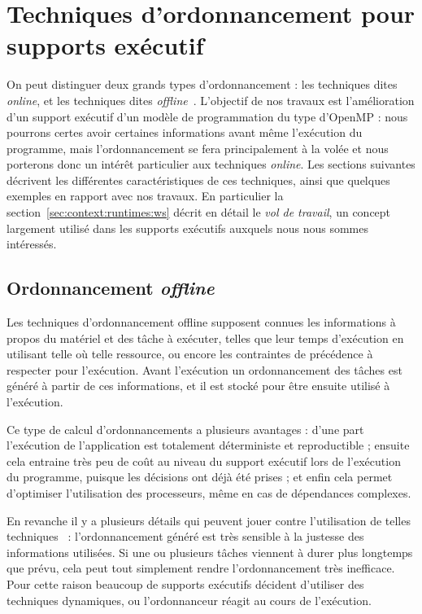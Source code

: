 \section{Techniques d'ordonnancement pour supports exécutif}\label{sec:context:runtimes}

On peut distinguer deux grands types d'ordonnancement : les techniques dites \emph{online}, et les techniques dites \emph{offline}~\cite{Karp1992}.
L'objectif de nos travaux est l'amélioration d'un support exécutif d'un modèle de programmation du type d'OpenMP : nous pourrons certes avoir certaines informations avant même l'exécution du programme, mais l'ordonnancement se fera principalement à la volée et nous porterons donc un intérêt particulier aux techniques \emph{online}.
Les sections suivantes décrivent les différentes caractéristiques de ces techniques, ainsi que quelques exemples en rapport avec nos travaux.
En particulier la section~\ref{sec:context:runtimes:ws} décrit en détail le \emph{vol de travail}, un concept largement utilisé dans les supports exécutifs auxquels nous nous sommes intéressés.

\subsection{Ordonnancement \emph{offline}}

Les techniques d'ordonnancement offline supposent connues les informations à propos du matériel et des tâche à exécuter, telles que leur temps d'exécution en utilisant telle où telle ressource, ou encore les contraintes de précédence à respecter pour l'exécution.
Avant l'exécution un ordonnancement des tâches est généré à partir de ces informations, et il est stocké pour être ensuite utilisé à l'exécution.

Ce type de calcul d'ordonnancements a plusieurs avantages : d'une part l'exécution de l'application est totalement déterministe et reproductible ; ensuite cela entraine très peu de coût au niveau du support exécutif lors de l'exécution du programme, puisque les décisions ont déjà été prises ; et enfin cela permet d'optimiser l'utilisation des processeurs, même en cas de dépendances complexes.

En revanche il y a plusieurs détails qui peuvent jouer contre l'utilisation de telles techniques~\cite{Locke1992} : l'ordonnancement généré est très sensible à la justesse des informations utilisées. Si une ou plusieurs tâches viennent à durer plus longtemps que prévu, cela peut tout simplement rendre l'ordonnancement très inefficace.
Pour cette raison beaucoup de supports exécutifs décident d'utiliser des techniques dynamiques, ou l'ordonnanceur réagit au cours de l'exécution.

